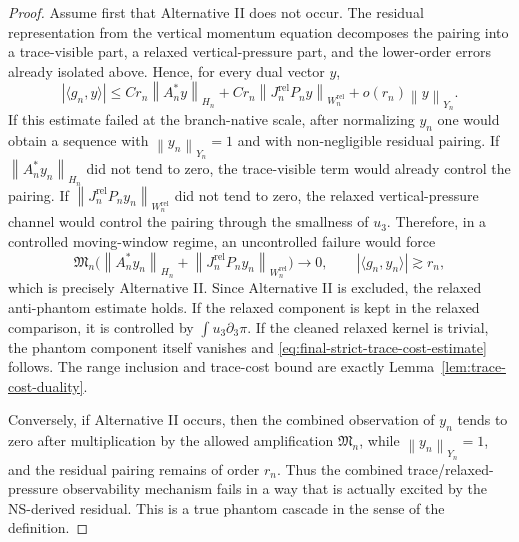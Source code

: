 \documentclass[11pt]{article}
\numberwithin{equation}{section}
\newcommand{\norm}[2]{\left\|#1\right\|_{#2}}
\begin{document}
\begin{proof}
Assume first that Alternative II does not occur.  The residual representation from the vertical
momentum equation decomposes the pairing into a trace-visible part, a relaxed vertical-pressure part,
and the lower-order errors already isolated above.  Hence, for every dual vector \(y\),
\[
        |\langle g_n,y\rangle|
        \le
        C r_n\norm{A_n^*y}{H_n}
        +C r_n\norm{J_n^{\mathrm{rel}}P_ny}{W_n^{\mathrm{rel}}}
        +o(r_n)\norm{y}{Y_n}.
\]
If this estimate failed at the branch-native scale, after normalizing \(y_n\) one would obtain a
sequence with \(\norm{y_n}{Y_n}=1\) and with non-negligible residual pairing.  If
\(\norm{A_n^*y_n}{H_n}\) did not tend to zero, the trace-visible term would already control the
pairing.  If \(\norm{J_n^{\mathrm{rel}}P_ny_n}{W_n^{\mathrm{rel}}}\) did not tend to zero, the relaxed
vertical-pressure channel would control the pairing through the smallness of \(u_3\).  Therefore, in a controlled moving-window regime, an uncontrolled failure would force
\[
        \mathfrak M_n\Big(
        \norm{A_n^*y_n}{H_n}
        +
        \norm{J_n^{\mathrm{rel}}P_ny_n}{W_n^{\mathrm{rel}}}
        \Big)\to0,
        \qquad
        |\langle g_n,y_n\rangle|\gtrsim r_n,
\]
which is precisely Alternative II.  Since Alternative II is excluded, the relaxed anti-phantom
estimate holds.  If the relaxed component is kept in the relaxed comparison, it is controlled by
\(\int u_3\partial_3\pi\).  If the cleaned relaxed kernel is trivial, the phantom component itself
vanishes and \eqref{eq:final-strict-trace-cost-estimate} follows.  The range inclusion and trace-cost
bound are exactly Lemma~\ref{lem:trace-cost-duality}.

Conversely, if Alternative II occurs, then the combined observation of \(y_n\) tends to zero after multiplication by the allowed amplification \(\mathfrak M_n\), while \(\norm{y_n}{Y_n}=1\), and the residual pairing remains of order \(r_n\).  Thus the combined
trace/relaxed-pressure observability mechanism fails in a way that is actually excited by the
NS-derived residual.  This is a true phantom cascade in the sense of the definition.
\end{proof}
\end{document}
